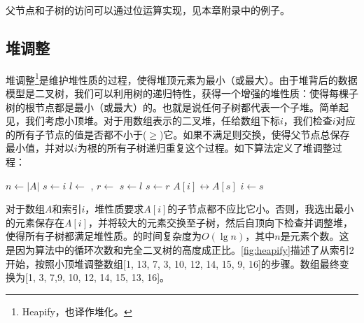 \documentclass[b5paper]{ctexart}
\begin{document}
父节点和子树的访问可以通过位运算实现，见本章附录中的例子。

\subsection{堆调整}

堆调整\footnote{Heapify，也译作堆化。}是维护堆性质的过程，使得堆顶元素为最小（或最大）。由于堆背后的数据模型是二叉树，我们可以利用树的递归特性，获得一个增强的堆性质：使得每棵子树的根节点都是最小（或最大）的。也就是说任何子树都代表一个子堆。简单起见，我们考虑小顶堆。对于用数组表示的二叉堆，任给数组下标$i$，我们检查$i$对应的所有子节点的值是否都不小于($\geq$)它。如果不满足则交换，使得父节点总保存最小值\cite{CLRS}，并对以$i$为根的所有子树递归重复这个过程。如下算法定义了堆调整过程：

\begin{algorithmic}[1]
  \State $n \gets |A|$
  \Loop
    \State $s \gets i$ 
    \State $l \gets$ , $r \gets$ 
      \State $s \gets l$
    \EndIf
      \State $s \gets r$
    \EndIf
      \State {} $A[i] \leftrightarrow A[s]$
      \State $i \gets s$
    \Else
      \State \Return
    \EndIf
  \EndLoop
\EndFunction
\end{algorithmic}

对于数组$A$和索引$i$，堆性质要求$A[i]$的子节点都不应比它小。否则，我选出最小的元素保存在$A[i]$，并将较大的元素交换至子树，然后自顶向下检查并调整堆，使得所有子树都满足堆性质。的时间复杂度为$O(\lg n)$，其中$n$是元素个数。这是因为算法中的循环次数和完全二叉树的高度成正比。\cref{fig:heapify}描述了从索引2开始，按照小顶堆调整数组[1, 13, 7, 3, 10, 12, 14, 15, 9, 16]的步骤。数组最终变换为[1, 3, 7,9, 10, 12, 14, 15, 13, 16]。
\end{document}

